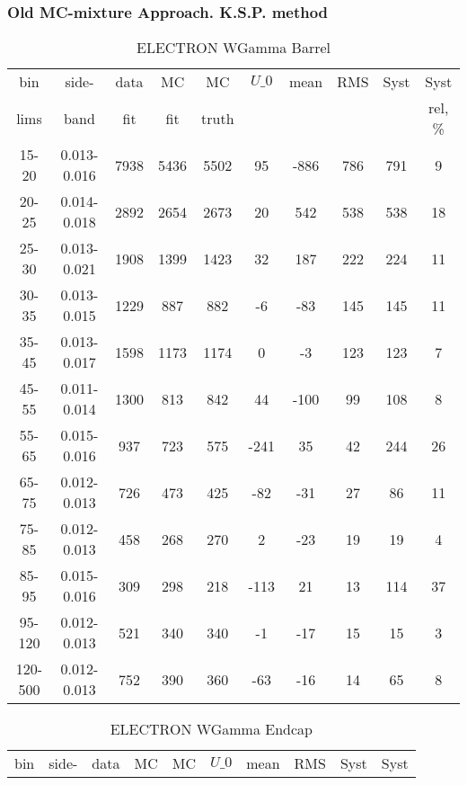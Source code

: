 \documentclass{beamer}
\begin{document}
\begin{frame}\frametitle{Old MC-mixture Approach. K.S.P. method}
\begin{table}[h]
  \tiny
  \begin{center}
  \caption{ELECTRON WGamma Barrel}
  \begin{tabular}{|c|c|c|c|c|c|c|c|c|c|}
    bin & side- & data & MC & MC    & $U\_{0}$ & mean & RMS & Syst & Syst \\ 
    lims & band & fit & fit & truth &       &      &     &      & rel, \% \\ \hline
    15-20 & 0.013-0.016 & 7938 & 5436 & 5502 & 95 & -886 & 786 & 791 & 9  \\ \hline
    20-25 & 0.014-0.018 & 2892 & 2654 & 2673 & 20 & 542 & 538 & 538 & 18  \\ \hline
    25-30 & 0.013-0.021 & 1908 & 1399 & 1423 & 32 & 187 & 222 & 224 & 11  \\ \hline
    30-35 & 0.013-0.015 & 1229 & 887 & 882 & -6 & -83 & 145 & 145 & 11  \\ \hline
    35-45 & 0.013-0.017 & 1598 & 1173 & 1174 & 0 & -3 & 123 & 123 & 7  \\ \hline
    45-55 & 0.011-0.014 & 1300 & 813 & 842 & 44 & -100 & 99 & 108 & 8  \\ \hline
    55-65 & 0.015-0.016 & 937 & 723 & 575 & -241 & 35 & 42 & 244 & 26  \\ \hline
    65-75 & 0.012-0.013 & 726 & 473 & 425 & -82 & -31 & 27 & 86 & 11  \\ \hline
    75-85 & 0.012-0.013 & 458 & 268 & 270 & 2 & -23 & 19 & 19 & 4  \\ \hline
    85-95 & 0.015-0.016 & 309 & 298 & 218 & -113 & 21 & 13 & 114 & 37  \\ \hline
    95-120 & 0.012-0.013 & 521 & 340 & 340 & -1 & -17 & 15 & 15 & 3  \\ \hline
    120-500 & 0.012-0.013 & 752 & 390 & 360 & -63 & -16 & 14 & 65 & 8  \\ \hline
  \end{tabular}
  \label{tab:systSbVar_Meth1_ELECTRON_WGamma_Barrel}
  \end{center}
\end{table}
\begin{table}[h]
  \tiny
  \begin{center}
  \caption{ELECTRON WGamma Endcap}
  \begin{tabular}{|c|c|c|c|c|c|c|c|c|c|}
    bin & side- & data & MC & MC    & $U\_{0}$ & mean & RMS & Syst & Syst \\ 

\end{tabular}
\end{center}
\end{table}
\end{frame}
\end{document}
